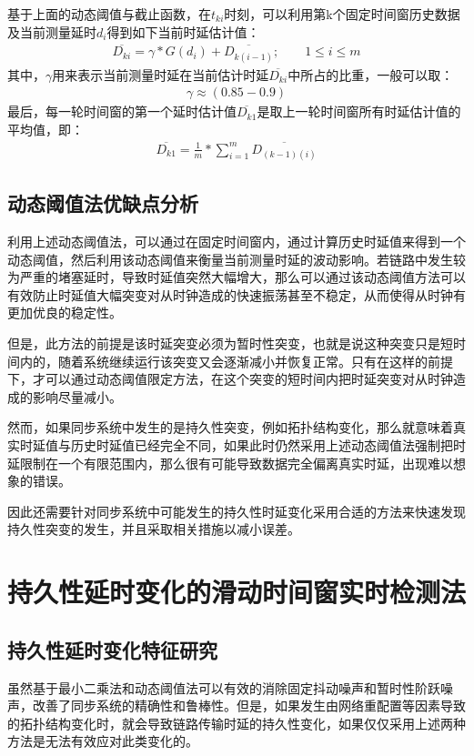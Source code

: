 基于上面的动态阈值与截止函数，在$t_{ki}$时刻，可以利用第k个固定时间窗历史数据及当前测量延时$d_{i}$得到如下当前时延估计值：
\begin{align}
\overline{D_{ki}} = \gamma * G(d_{i}) + \overline{D_{k(i-1)}}; \qquad 1\leq i \leq m
\end{align}
其中，$\gamma$用来表示当前测量时延在当前估计时延$\overline{D_{ki}}$中所占的比重，一般可以取：
\begin{align}
\gamma \approx (0.85-0.9)
\end{align}
最后，每一轮时间窗的第一个延时估计值$\overline{D_{k1}}$是取上一轮时间窗所有时延估计值的平均值，即：
\begin{align}
\overline{D_{k1}} = \frac{1}{m} * \sum_{i=1}^{m}\overline{D_{(k-1)(i)}}
\end{align}

\subsection{动态阈值法优缺点分析}
利用上述动态阈值法，可以通过在固定时间窗内，通过计算历史时延值来得到一个动态阈值，然后利用该动态阈值来衡量当前测量时延的波动影响。若链路中发生较为严重的堵塞延时，导致时延值突然大幅增大，那么可以通过该动态阈值方法可以有效防止时延值大幅突变对从时钟造成的快速振荡甚至不稳定，从而使得从时钟有更加优良的稳定性。

但是，此方法的前提是该时延突变必须为暂时性突变，也就是说这种突变只是短时间内的，随着系统继续运行该突变又会逐渐减小并恢复正常。只有在这样的前提下，才可以通过动态阈值限定方法，在这个突变的短时间内把时延突变对从时钟造成的影响尽量减小。

然而，如果同步系统中发生的是持久性突变，例如拓扑结构变化，那么就意味着真实时延值与历史时延值已经完全不同，如果此时仍然采用上述动态阈值法强制把时延限制在一个有限范围内，那么很有可能导致数据完全偏离真实时延，出现难以想象的错误。

因此还需要针对同步系统中可能发生的持久性时延变化采用合适的方法来快速发现持久性突变的发生，并且采取相关措施以减小误差。

\section{持久性延时变化的滑动时间窗实时检测法}
\subsection{持久性延时变化特征研究}
虽然基于最小二乘法和动态阈值法可以有效的消除固定抖动噪声和暂时性阶跃噪声，改善了同步系统的精确性和鲁棒性。但是，如果发生由网络重配置等因素导致的拓扑结构变化时，就会导致链路传输时延的持久性变化，如果仅仅采用上述两种方法是无法有效应对此类变化的。

